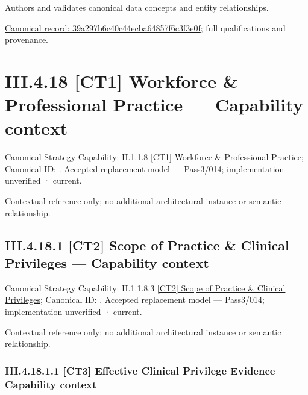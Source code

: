 Authors and validates canonical data concepts and entity relationships.


{\footnotesize \href{../../../../../../../../continuum/business/business-function/39a297b6c40c44ecba64857f6c3f3e0f.md}{Canonical record: 39a297b6c40c44ecba64857f6c3f3e0f}; full qualifications and provenance.}\par
\section*{III.4.18 [CT1] Workforce \& Professional Practice — Capability context}
\label{navigation:III.4.18}

{\small Canonical Strategy Capability: II.1.1.8 \hyperref[element:4be7b3b9fd754a20890302153203d5a1]{[CT1] Workforce \& Professional Practice}; Canonical ID: \texttt{}. Accepted replacement model — Pass3/014; implementation unverified · current.}\par
Contextual reference only; no additional architectural instance or semantic relationship.\par
\subsection*{III.4.18.1 [CT2] Scope of Practice \& Clinical Privileges — Capability context}
\label{navigation:III.4.18.1}

{\small Canonical Strategy Capability: II.1.1.8.3 \hyperref[element:eef619227c014eb2803da8a9e47635fe]{[CT2] Scope of Practice \& Clinical Privileges}; Canonical ID: \texttt{}. Accepted replacement model — Pass3/014; implementation unverified · current.}\par
Contextual reference only; no additional architectural instance or semantic relationship.\par
\subsubsection*{III.4.18.1.1 [CT3] Effective Clinical Privilege Evidence — Capability context}
\label{navigation:III.4.18.1.1}

